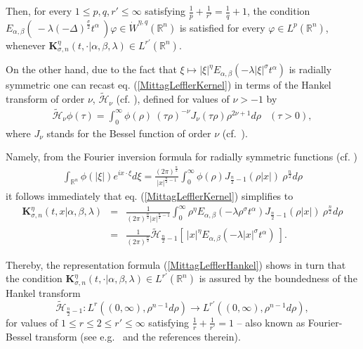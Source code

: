 \documentclass{amsart}
\theoremstyle{definition}
\theoremstyle{remark}
\numberwithin{equation}{section}
\newcommand{\BR}{{\mathbb R}}
\begin{document}
Then, for every $1\leq p,q,r' \leq \infty$ satisfying $\displaystyle \frac{1}{p}+\frac{1}{r'}=\frac{1}{q}+1$, the condition $E_{\alpha,\beta}\left(~-\lambda(-\Delta)^{\frac{\sigma}{2}} t^\alpha~\right)\varphi\in \dot{W}^{\eta,q}(\BR^n)$ is satisfied for every $\varphi\in L^p(\BR^n)$, whenever ${\bm K}_{\sigma,n}^{\eta}(t,\cdot|\alpha,\beta,\lambda)\in L^{r'}(\BR^n)$.

On the other hand, due to the fact that $\displaystyle \xi \mapsto |\xi|^\eta E_{\alpha,\beta}\left(-\lambda|\xi|^\sigma t^\alpha\right)$ is radially symmetric one can recast eq. (\ref{MittagLefflerKernel}) in terms of the Hankel transform of order $\nu$, $\widetilde{\mathcal{H}}_\nu$ (cf. \cite{DeCarli08}), defined for values of $\nu>-1$ by
\begin{eqnarray*}
	\widetilde{\mathcal{H}}_{\nu}\phi(\tau)=\int_{0}^\infty \phi(\rho)~(\tau\rho)^{-\nu}J_{\nu}(\tau\rho)\rho^{2\nu+1}d\rho & (\tau>0),
\end{eqnarray*}
where $J_\nu$ stands for the Bessel function of order $\nu$ (cf.~\cite[Subsection 1.7]{KST06}).

Namely, from the Fourier inversion formula for radially symmetric functions (cf. \cite[p. 485, Lemma 25.1]{samko1993fractional})
\begin{eqnarray*}
	\label{FourierInversionRadial}
	\int_{\BR^n} \phi(|\xi|)e^{i x\cdot \xi} d\xi =\frac{(2\pi)^{\frac{n}{2}}}{|x|^{\frac{n}{2}-1}} \int_{0}^{\infty} \phi(\rho) J_{\frac{n}{2}-1}(\rho|x|)~\rho^{\frac{n}{2}}d\rho
\end{eqnarray*}
it follows immediately that eq. (\ref{MittagLefflerKernel}) simplifies to
\begin{eqnarray}
	\label{MittagLefflerHankel}
	{\bm K}_{\sigma,n}^\eta(t,x|\alpha,\beta,\lambda)&=&\displaystyle \frac{1}{(2\pi)^{\frac{n}{2}}|x|^{\frac{n}{2}-1}} \int_{0}^{\infty} \rho^\eta E_{\alpha,\beta}(-\lambda\rho^\sigma t^\alpha) J_{\frac{n}{2}-1}(\rho|x|)~\rho^{\frac{n}{2}}d\rho \nonumber \\
	&=&\displaystyle \frac{1}{(2\pi)^{\frac{n}{2}}} \widetilde{\mathcal{H}}_{\frac{n}{2}-1}\left[~|x|^\eta E_{\alpha,\beta}(-\lambda|x|^\sigma t^\alpha)~\right].
\end{eqnarray}

Thereby, the representation formula (\ref{MittagLefflerHankel}) shows in turn that the condition ${\bm K}_{\sigma,n}^{\eta}(t,\cdot|\alpha,\beta,\lambda)\in L^{r'}(\BR^n)$ is assured by the boundedness of the Hankel transform $$\widetilde{\mathcal{H}}_{\frac{n}{2}-1}:L^r((0,\infty),\rho^{n-1}d\rho)\rightarrow L^{r'}((0,\infty),\rho^{n-1}d\rho),$$ for values of $1\leq r\leq 2\leq r'\leq \infty$ satisfying $\displaystyle \frac{1}{r}+\frac{1}{r'}=1$ -- also known as Fourier-Bessel transform (see e.g.~\cite{colzani1993equiconvergence} and the references therein). 
\end{document}
